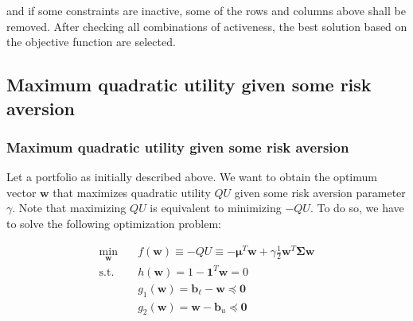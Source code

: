 \documentclass{beamer}
\begin{document}
\begin{frame}
\justifying
and if some constraints are inactive, some of the rows and columns above shall be removed. After checking all combinations of activeness, the best solution based on the objective function are selected.

\end{frame}












\subsection{Maximum quadratic utility given some risk aversion}

\begin{frame}
\frametitle{\textbf{Maximum quadratic utility given some risk aversion}}

\justifying
Let a portfolio as initially described above. We want to obtain the optimum vector $\mathbf{w}$ that maximizes quadratic utility $QU$ given some risk aversion parameter $\gamma$. Note that maximizing $QU$ is equivalent to minimizing $-QU$. To do so, we have to solve the following optimization problem:

\vspace{0.2cm}
\justifying
\begin{equation}
\begin{aligned}
\label{eq:8}
\min_{\mathbf{w}} \quad & f\left(\mathbf{w}\right) \equiv - QU \equiv -\boldsymbol\mu^{T} \mathbf{w} + \gamma \frac{1}{2} \mathbf{w}^{T}\mathbf{\Sigma}\mathbf{w} \\
\textrm{s.t.} \quad & h\left(\mathbf{w}\right) = 1 - \mathbf{1}^{T} \mathbf{w} = 0 \\
                             & g_{1}\left(\mathbf{w}\right) = \mathbf{b}_{\ell} - \mathbf{w} \preccurlyeq \mathbf{0} \\
                             & g_{2}\left(\mathbf{w}\right) = \mathbf{w} - \mathbf{b}_{u} \preccurlyeq \mathbf{0} \\
\end{aligned}
\end{equation}

\end{frame}
\end{document}

